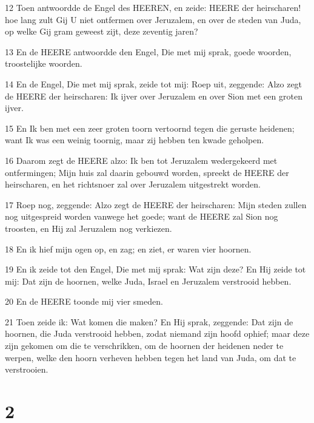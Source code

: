 \par 12 Toen antwoordde de Engel des HEEREN, en zeide: HEERE der heirscharen! hoe lang zult Gij U niet ontfermen over Jeruzalem, en over de steden van Juda, op welke Gij gram geweest zijt, deze zeventig jaren?
\par 13 En de HEERE antwoordde den Engel, Die met mij sprak, goede woorden, troostelijke woorden.
\par 14 En de Engel, Die met mij sprak, zeide tot mij: Roep uit, zeggende: Alzo zegt de HEERE der heirscharen: Ik ijver over Jeruzalem en over Sion met een groten ijver.
\par 15 En Ik ben met een zeer groten toorn vertoornd tegen die geruste heidenen; want Ik was een weinig toornig, maar zij hebben ten kwade geholpen.
\par 16 Daarom zegt de HEERE alzo: Ik ben tot Jeruzalem wedergekeerd met ontfermingen; Mijn huis zal daarin gebouwd worden, spreekt de HEERE der heirscharen, en het richtsnoer zal over Jeruzalem uitgestrekt worden.
\par 17 Roep nog, zeggende: Alzo zegt de HEERE der heirscharen: Mijn steden zullen nog uitgespreid worden vanwege het goede; want de HEERE zal Sion nog troosten, en Hij zal Jeruzalem nog verkiezen.
\par 18 En ik hief mijn ogen op, en zag; en ziet, er waren vier hoornen.
\par 19 En ik zeide tot den Engel, Die met mij sprak: Wat zijn deze? En Hij zeide tot mij: Dat zijn de hoornen, welke Juda, Israel en Jeruzalem verstrooid hebben.
\par 20 En de HEERE toonde mij vier smeden.
\par 21 Toen zeide ik: Wat komen die maken? En Hij sprak, zeggende: Dat zijn de hoornen, die Juda verstrooid hebben, zodat niemand zijn hoofd ophief; maar deze zijn gekomen om die te verschrikken, om de hoornen der heidenen neder te werpen, welke den hoorn verheven hebben tegen het land van Juda, om dat te verstrooien.

\chapter{2}

